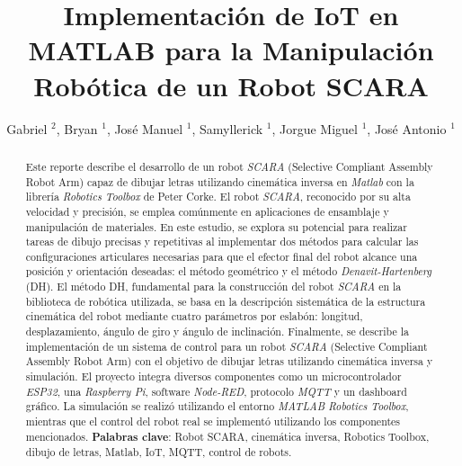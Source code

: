 \documentclass[final]{foresj}
\begin{document}
\title{Implementación de IoT en MATLAB para la Manipulación Robótica de un Robot SCARA}

\author[Implementación de IoT en MATLAB para la Manipulación
Robótica de un Robot SCARA]{Gabriel $^{2}$, Bryan $^{1}$, José Manuel $^{1}$, Samyllerick $^{1}$, Jorgue Miguel $^{1}$, José Antonio $^{1}$}

\address{$^{1}$Universidad Aut\'{o}noma Metropolitana, Unidad Azcapotzalco,~Ciudad de M\'{e}xico, M\'{e}xico\\
$^{2}$Universidad Nacional Autónoma de México, Facultad de Estudios Superiores Acatlán, Estado de México, México}


\date{}

\begin{abstract} Este reporte describe el desarrollo de un robot \textit{SCARA} (Selective Compliant Assembly Robot Arm) capaz de dibujar letras utilizando cinemática inversa en \textit{Matlab} con la librería \textit{Robotics Toolbox} de Peter Corke. El robot \textit{SCARA}, reconocido por su alta velocidad y precisión, se emplea comúnmente en aplicaciones de ensamblaje y manipulación de materiales. En este estudio, se explora su potencial para realizar tareas de dibujo precisas y repetitivas al implementar dos métodos para calcular las configuraciones articulares necesarias para que el efector final del robot alcance una posición y orientación deseadas: el método geométrico y el método \textit{Denavit-Hartenberg} (DH). El método DH, fundamental para la construcción del robot \textit{SCARA} en la biblioteca de robótica utilizada, se basa en la descripción sistemática de la estructura cinemática del robot mediante cuatro parámetros por eslabón: longitud, desplazamiento, ángulo de giro y ángulo de inclinación.
\break
\newline
Finalmente, se describe la implementación de un sistema de control para un robot \textit{SCARA} (Selective Compliant Assembly Robot Arm) con el objetivo de dibujar letras utilizando cinemática inversa y simulación. El proyecto integra diversos componentes como un microcontrolador \textit{ESP32}, una \textit{Raspberry Pi}, software \textit{Node-RED}, protocolo \textit{MQTT} y un dashboard gráfico. La simulación se realizó utilizando el entorno \textit{MATLAB Robotics Toolbox}, mientras que el control del robot real se implementó utilizando los componentes mencionados.
\break
\newline
\textbf{Palabras clave}: Robot SCARA, cinemática inversa, Robotics Toolbox, dibujo de letras, Matlab, IoT, MQTT, control de robots. 
\end{abstract}
\end{document}
